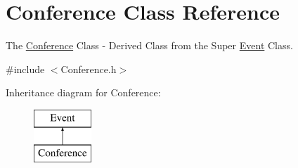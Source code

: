 \hypertarget{classConference}{}\section{Conference Class Reference}
\label{classConference}


The \hyperlink{classConference}{Conference} Class -\/ Derived Class from the Super \hyperlink{classEvent}{Event} Class.  




{\ttfamily \#include $<$Conference.\+h$>$}

Inheritance diagram for Conference\+:\begin{figure}[H]
\begin{center}
\leavevmode
\includegraphics[height=2.000000cm]{classConference}
\end{center}
\end{figure}
